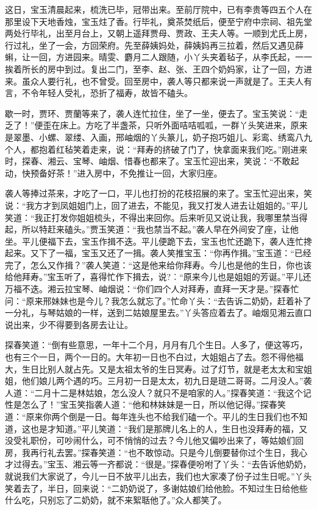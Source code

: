 \documentclass[12pt,oneside]{book}
\begin{document}
这日，宝玉清晨起来，梳洗已毕，冠带出来。至前厅院中，已有李贵等四五个人在那里设下天地香烛，宝玉炷了香。行毕礼，奠茶焚纸后，便至宁府中宗祠、祖先堂两处行毕礼，出至月台上，又朝上遥拜贾母、贾政、王夫人等。一顺到尤氏上房，行过礼，坐了一会，方回荣府。先至薛姨妈处，薛姨妈再三拉着，然后又遇见薛蝌，让一回，方进园来。晴雯、麝月二人跟随，小丫头夹着毡子，从李氏起，一一挨着所长的房中到过。复出二门，至李、赵、张、王四个奶妈家，让了一回，方进来。虽众人要行礼，也不曾受。回至房中，袭人等只都来说一声就是了。王夫人有言，不令年轻人受礼，恐折了福寿，故皆不磕头。

歇一时，贾环、贾蘭等来了，袭人连忙拉住，坐了一坐，便去了。宝玉笑说：“走乏了！”便歪在床上。方吃了半盏茶，只听外面咭咭呱呱，一群丫头笑进来，原来是翠墨、小螺、翠缕、入画，邢岫烟的丫头篆儿，奶子抱巧姐儿、彩鸾、绣鸾八九个人，都抱着红毡笑着走来，说：“拜寿的挤破了门了，快拿面来我们吃。”刚进来时，探春、湘云、宝琴、岫烟、惜春也都来了。宝玉忙迎出来，笑说：“不敢起动，快预备好茶！”进入房中，不免推让一回，大家归座。

袭人等捧过茶来，才吃了一口，平儿也打扮的花枝招展的来了。宝玉忙迎出来，笑说：“我方才到凤姐姐门上，回了进去，不能见，我又打发人进去让姐姐的。”平儿笑道：“我正打发你姐姐梳头，不得出来回你。后来听见又说让我，我哪里禁当得起，所以特赶来磕头。”贾玉笑道：“我也禁当不起。”袭人早在外间安了座，让他坐。平儿便福下去，宝玉作揖不迭。平儿便跪下去，宝玉也忙还跪下，袭人连忙搀起来。又下了一福，宝玉又还了一揖。袭人笑推宝玉：“你再作揖。”宝玉道：“已经完了，怎么又作揖？”袭人笑道：“这是他来给你拜寿。今儿也是他的生日，你也该给他拜寿。”宝玉听了，喜得忙作下揖去，说?︰“原来今儿也是姐姐的芳诞。”平儿还万福不迭。湘云拉宝琴、岫烟说：“你们四个人对拜寿，直拜一天才是。”探春忙问：“原来邢妹妹也是今儿？我怎么就忘了。”忙命丫头：“去告诉二奶奶，赶着补了一分礼，与琴姑娘的一样，送到二姑娘屋里去。”丫头答应着去了。岫烟见湘云直口说出来，少不得要到各房去让让。

探春笑道：“倒有些意思，一年十二个月，月月有几个生日。人多了，便这等巧，也有三个一日，两个一日的。大年初一日也不白过，大姐姐占了去。怨不得他福大，生日比别人就占先。又是太祖太爷的生日冥寿。过了灯节，就是老太太和宝姐姐，他们娘儿两个遇的巧。三月初一日是太太，初九日是琏二哥哥。二月没人。”袭人道：“二月十二是林姑娘，怎么没人？就只不是咱家的人。”探春笑道：“我这个记性是怎么了！”宝玉笑指袭人道：“他和林妹妹是一日，所以他记得。”探春笑道：“原来你两个倒是一日。每年连头也不给我们磕一个。平儿的生日我们也不知道，这也是才知道。”平儿笑道：“我们是那牌儿名上的人，生日也没拜寿的福，又没受礼职份，可吵闹什么，可不悄悄的过去？今儿他又偏吵出来了，等姑娘们回房，我再行礼去罢。”探春笑道：“也不敢惊动。只是今儿倒要替你过个生日，我心才过得去。”宝玉、湘云等一齐都说：“很是。”探春便吩咐了丫头：“去告诉他奶奶，就说我们大家说了，今儿一日不放平儿出去，我们也大家凑了份子过生日呢。”丫头笑着去了，半日，回来说：“二奶奶说了，多谢姑娘们给他脸。不知过生日给他些什么吃，只别忘了二奶奶，就不来絮聒他了。”众人都笑了。
\end{document}
